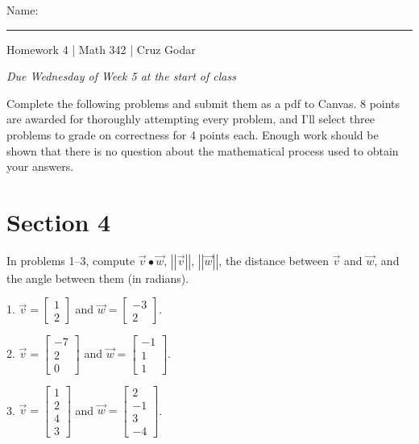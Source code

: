 \documentclass{article}
\begin{document}
\Large Name: \rule{2in}{0.15mm} \hfill Homework 4 | Math 342 | Cruz Godar \vspace{4pt}  \normalsize

\textit{Due Wednesday of Week 5 at the start of class}

Complete the following problems and submit them as a pdf to Canvas. 8 points are awarded for thoroughly attempting every problem, and I'll select three problems to grade on correctness for 4 points each. Enough work should be shown that there is no question about the mathematical process used to obtain your answers.

\section{Section 4}

In problems 1--3, compute $\vec{v} \bullet \vec{w}$, $\left| \left| \vec{v} \right| \right|$, $\left| \left| \vec{w} \right| \right|$, the distance between $\vec{v}$ and $\vec{w}$, and the angle between them (in radians).

1. $\vec{v} = \left[\begin{array}{c} 1 \\ 2 \end{array}\right]$ and $\vec{w} = \left[\begin{array}{c} -3 \\ 2 \end{array}\right]$.

2. $\vec{v} = \left[\begin{array}{c} -7 \\ 2 \\ 0 \end{array}\right]$ and $\vec{w} = \left[\begin{array}{c} -1 \\ 1 \\ 1 \end{array}\right]$.

3. $\vec{v} = \left[\begin{array}{c} 1 \\ 2 \\ 4 \\ 3 \end{array}\right]$ and $\vec{w} = \left[\begin{array}{c} 2 \\ -1 \\ 3 \\ -4 \end{array}\right]$.
\end{document}
